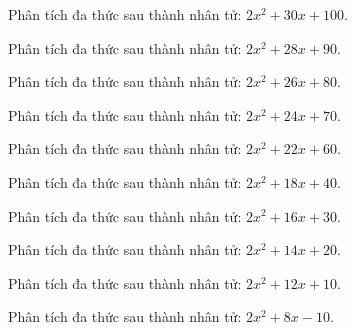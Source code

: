 \begin{bt}
	Phân tích đa thức sau thành nhân tử: $2 x^2 + 30 x + 100$.
\end{bt}
\begin{bt}
	Phân tích đa thức sau thành nhân tử: $2 x^2 + 28 x + 90$.
\end{bt}
\begin{bt}
	Phân tích đa thức sau thành nhân tử: $2 x^2 + 26 x + 80$.
\end{bt}
\begin{bt}
	Phân tích đa thức sau thành nhân tử: $2 x^2 + 24 x + 70$.
\end{bt}
\begin{bt}
	Phân tích đa thức sau thành nhân tử: $2 x^2 + 22 x + 60$.
\end{bt}
\begin{bt}
	Phân tích đa thức sau thành nhân tử: $2 x^2 + 18 x + 40$.
\end{bt}
\begin{bt}
	Phân tích đa thức sau thành nhân tử: $2 x^2 + 16 x + 30$.
\end{bt}
\begin{bt}
	Phân tích đa thức sau thành nhân tử: $2 x^2 + 14 x + 20$.
\end{bt}
\begin{bt}
	Phân tích đa thức sau thành nhân tử: $2 x^2 + 12 x + 10$.
\end{bt}
\begin{bt}
	Phân tích đa thức sau thành nhân tử: $2 x^2 + 8 x - 10$.
\end{bt}
